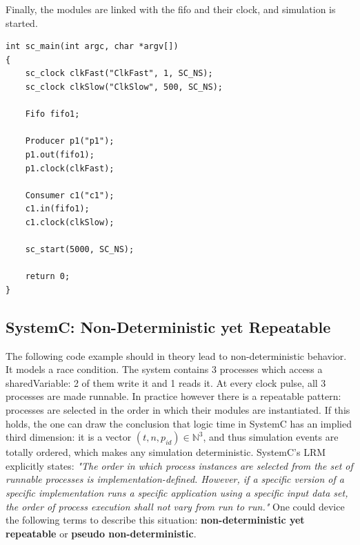 \documentclass[11pt]{article}
\begin{document}
Finally, the modules are linked with the fifo and their clock, and simulation is started.
\begin{verbatim}
int sc_main(int argc, char *argv[])
{
    sc_clock clkFast("ClkFast", 1, SC_NS);
    sc_clock clkSlow("ClkSlow", 500, SC_NS);

    Fifo fifo1;

    Producer p1("p1");
    p1.out(fifo1);
    p1.clock(clkFast);

    Consumer c1("c1");
    c1.in(fifo1);
    c1.clock(clkSlow);

    sc_start(5000, SC_NS);

    return 0;
}
\end{verbatim}

\subsection{SystemC: Non-Deterministic yet Repeatable}
\label{AppendixB}

The following code example should in theory lead to non-deterministic behavior.
It models a race condition.
The system contains 3 processes which access a sharedVariable: 2 of them write it and 1 reads it.
At every clock pulse, all 3 processes are made runnable.
In practice however there is a repeatable pattern: processes are selected in the order in which their modules are instantiated.
If this holds, the one can draw the conclusion that logic time in SystemC has an implied third dimension: it is a vector \((t,n,p_{id}) \in \mathbb{N}^3\), and thus simulation events are totally ordered, which makes any simulation deterministic.
SystemC's LRM explicitly states:
\textit{"The order in which process instances are selected from the set of runnable processes is implementation-defined. However, if a specific version of a specific implementation runs a specific application using a specific input data set, the order of process execution shall not vary from run to run."}
One could device the following terms to describe this situation: \textbf{non-deterministic yet repeatable} or \textbf{pseudo non-deterministic}.
\end{document}
